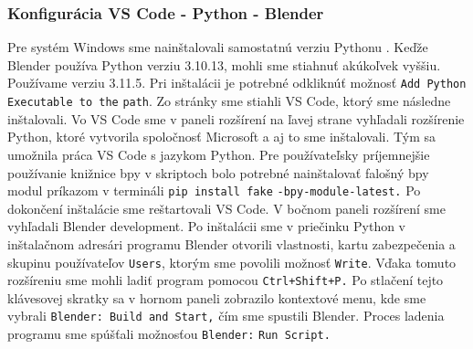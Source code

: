\subsubsection{Konfigurácia VS Code - Python - Blender}
Pre systém Windows sme nainštalovali samostatnú verziu Pythonu \cite{PythonDownload}. Keďže Blender používa Python verziu 3.10.13, mohli sme stiahnuť akúkoľvek vyššiu. Používame verziu 3.11.5. Pri inštalácii je potrebné odkliknúť možnosť \verb|Add Python Executable to the| \verb|path|. Zo stránky \cite{VSCode} sme stiahli VS Code, ktorý sme následne inštalovali. Vo VS Code sme v paneli rozšírení na ľavej strane vyhľadali rozšírenie Python, ktoré vytvorila spoločnosť Microsoft a aj to sme inštalovali. Tým sa umožnila práca VS Code s jazykom Python. Pre používateľsky príjemnejšie používanie knižnice bpy v skriptoch bolo potrebné nainštalovať falošný bpy modul \cite{Fake-bpy-module} príkazom v termináli \verb|pip install fake| \verb|-bpy-module-latest.|
Po dokončení inštalácie sme reštartovali VS Code. V bočnom paneli rozšírení sme vyhľadali Blender development. Po inštalácii sme v priečinku Python v inštalačnom adresári programu Blender otvorili vlastnosti, kartu zabezpečenia a skupinu používateľov \verb|Users|, ktorým sme povolili možnosť \verb|Write|. Vďaka tomuto rozšíreniu sme mohli ladiť program pomocou \verb|Ctrl+Shift+P.| Po stlačení tejto klávesovej skratky sa v hornom paneli zobrazilo kontextové menu, kde sme vybrali \verb|Blender: Build and Start,| čím sme spustili Blender. Proces ladenia programu sme spúšťali možnosťou \verb|Blender:| \verb|Run Script.|
